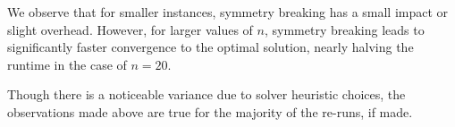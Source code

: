 We observe that for smaller instances, symmetry breaking has a small impact or slight overhead. However, for larger values of $n$, symmetry breaking leads to significantly faster convergence to the optimal solution, nearly halving the runtime in the case of $n=20$.

Though there is a noticeable variance due to solver heuristic choices, the observations made above are true for the majority of the re-runs, if made. 



